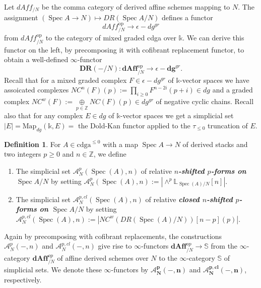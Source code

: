 \documentclass[11pt]{amsart}
\newcommand {\DR} {\mathbf{DR}}
\newcommand  {\medg}     {\epsilon-\mathbf{dg}^{gr}}
\newcommand  {\cdga}     {\mathrm{cdga}}
\newcommand  {\dAff}     {\mathbf{dAff}}
\DeclareMathOperator{\Spec}{Spec}
\theoremstyle{plain}
\numberwithin{equation}{section}
\theoremstyle{definition}
\newtheorem{Def}{Definition}[section]
\theoremstyle{plain}
\begin{document}
\smallskip

Let $dAff_{/N}$ be the comma category of derived affine schemes mapping to $N$.
The assignment $(\Spec A\longrightarrow N)\mapsto DR(\Spec A/N)$ defines a functor 
\begin{equation*}
dAff_{/N}^{\text{op}} \longrightarrow \epsilon-dg^{gr}
\end{equation*}
from $dAff_{/N}^{\text{op}}$ to the category of mixed graded cdga over $\mathbb{k}$. 
We can derive this functor on the left, by precomposing it with cofibrant replacement functor, to obtain 
a well-defined $\infty$-functor 
\[
\DR(-/N): \dAff^{\text{op}}_{/N}\longrightarrow \medg.
\]
Recall that for a mixed graded complex $F \in \epsilon-dg^{gr}$ of $\mathbb{k}$-vector spaces we have assoicated  complexes $NC^n(F)(p) := \underset{i\geq 0}\prod F^{n-2i}(p+i) \in dg$ and a graded complex 
$NC^w(F):= \underset{p\in \mathbb Z}\oplus NC(F)(p) \in  dg^{gr}$ of negative cyclic chains. 
Recall also that for any complex $E \in dg$ of $\mathbb{k}$-vector spaces we get a simplicial set $|E| = \text{Map}_{dg}(\mathbb{k},E) =$ the Dold-Kan functor applied to the $\tau_{\leq 0}$ truncation of $E$.

\smallskip


\begin{Def} 
For $A \in \cdga^{\leq 0}$ with a map $\Spec A\longrightarrow N$ of derived stacks and two integers $p \geq 0$ and $n \in \mathbb Z$, we define
\begin{enumerate}
\item The simplicial set $\mathcal A^p_N (\Spec (A), n )$ of relative \emph{\bfseries $n$-shifted $p$-forms on $\Spec A/N$} by setting $\mathcal A^p_N (\Spec (A), n ) := \left| \wedge^p  \mathbb L_{\Spec (A)/N}[n]\right|$.

\item The simplicial set $\mathcal A^{p,cl}_N(\Spec (A),n)$ of relative  \emph{\bfseries closed $n$-shifted $p$-forms on $\Spec A/N$} by setting  $\mathcal A^{p,cl}_N(\Spec (A),n) := | NC^w(DR(\Spec (A)/N))[n - p](p)|$.
\end{enumerate}
\end{Def}


\smallskip

\noindent

Again by precomposing with cofibrant replacements, the constructions $\mathcal A^p_N ( -, n )$ and $\mathcal A^{p,cl}_N(-,n)$ give rise to $\infty$-functors \linebreak $\dAff^{op}_{/N}\longrightarrow \mathbb{S} $ from the $\infty$-category  $\dAff^{op}_{/N}
$ of affine derived schemes over $N$  to the $\infty$-category $\mathbb{S}$ of simplicial sets. We denote these $\infty$-functors by $\boldsymbol{\mathcal A^p_N ( -, n )}$ and $\boldsymbol{\mathcal A^{p,cl}_N(-,n)}$, respectively. 
\end{document}
